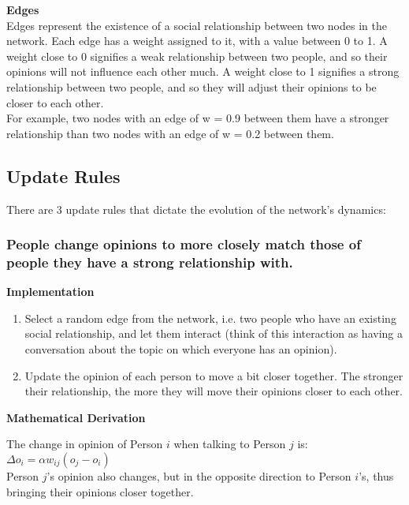\documentclass[11pt]{article}
\begin{document}
\textbf{Edges}\\

Edges represent the existence of a social relationship between two nodes
in the network. Each edge has a weight assigned to it, with a value
between 0 to 1. A weight close to 0 signifies a weak relationship
between two people, and so their opinions will not influence each other
much. A weight close to 1 signifies a strong relationship between two
people, and so they will adjust their opinions to be closer to each
other.\\

For example, two nodes with an edge of w = 0.9 between them have a
stronger relationship than two nodes with an edge of w = 0.2 between
them.

\subsection{Update Rules}

There are 3 update rules that dictate the evolution of the network's
dynamics:

\subsubsection{People change opinions to more closely match those of
people they have a strong relationship with.}

\textbf{Implementation}

\begin{enumerate}
\def\labelenumi{\arabic{enumi})}
\item
  Select a random edge from the network, i.e. two people who have an
  existing social relationship, and let them interact (think of this
  interaction as having a conversation about the topic on which everyone
  has an opinion).
\item
  Update the opinion of each person to move a bit closer together. The
  stronger their relationship, the more they will move their opinions
  closer to each other.
\end{enumerate}

\textbf{Mathematical Derivation}

The change in opinion of Person \(i\) when talking to Person \(j\) is:\\

\(\Delta o_i = \alpha w_{ij}(o_j-o_i)\)
\\

Person \(j\)'s opinion also changes, but in the opposite direction to
Person \(i\)'s, thus bringing their opinions closer together.\\
\end{document}

